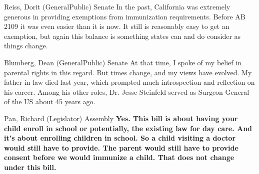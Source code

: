\begin{result}{7.46386998412798}{Reiss, Dorit (GeneralPublic) Senate}
In the past, California was extremely generous in providing exemptions from immunization requirements. Before AB 2109 it was even easier than it is now. It still is reasonably easy to get an exemption, but again this balance is something states can and do consider as things change.
\end{result}

\begin{result}{7.024375537439714}{Blumberg, Dean (GeneralPublic) Senate}
At that time, I spoke of my belief in parental rights in this regard. But times change, and my views have evolved. My father-in-law died last year, which prompted much introspection and reflection on his career. Among his other roles, Dr. Jesse Steinfeld served as Surgeon General of the US about 45 years ago.
\end{result}

\begin{result}{7.022988478253524}{Pan, Richard (Legislator) Assembly}
\textbf{Yes. This bill is about having your child enroll in school or potentially, the existing law for day care. And it's about enrolling children in school. So a child visiting a doctor would still have to provide. The parent would still have to provide consent before we would immunize a child. That does not change under this bill.
}\end{result}

